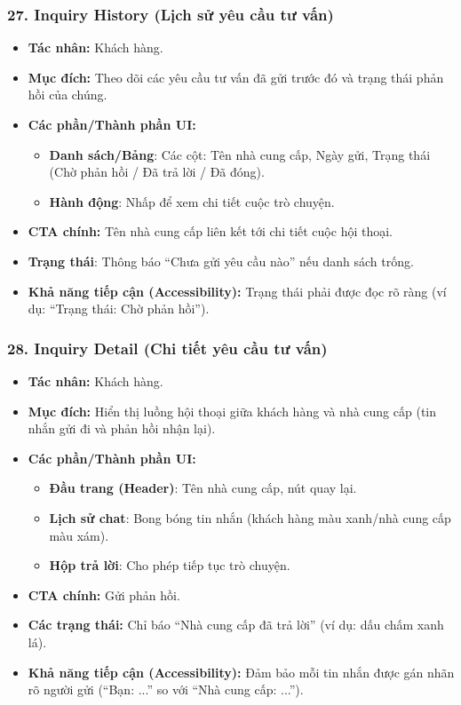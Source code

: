 \documentclass[11pt,a4paper]{article}
\begin{document}
\subsubsection{27. Inquiry History (Lịch sử yêu cầu tư vấn)}
\begin{itemize}
    \item \textbf{Tác nhân:} Khách hàng.
    \item \textbf{Mục đích:} Theo dõi các yêu cầu tư vấn đã gửi trước đó và trạng thái phản hồi của chúng.
    \item \textbf{Các phần/Thành phần UI:}
    \begin{itemize}
        \item \textbf{Danh sách/Bảng}: Các cột: Tên nhà cung cấp, Ngày gửi, Trạng thái (Chờ phản hồi / Đã trả lời / Đã đóng).
        \item \textbf{Hành động}: Nhấp để xem chi tiết cuộc trò chuyện.
    \end{itemize}
    \item \textbf{CTA chính:} Tên nhà cung cấp liên kết tới chi tiết cuộc hội thoại.
    \item \textbf{Trạng thái}: Thông báo ``Chưa gửi yêu cầu nào'' nếu danh sách trống.
    \item \textbf{Khả năng tiếp cận (Accessibility):} Trạng thái phải được đọc rõ ràng (ví dụ: ``Trạng thái: Chờ phản hồi'').
\end{itemize}

\subsubsection{28. Inquiry Detail (Chi tiết yêu cầu tư vấn)}
\begin{itemize}
    \item \textbf{Tác nhân:} Khách hàng.
    \item \textbf{Mục đích:} Hiển thị luồng hội thoại giữa khách hàng và nhà cung cấp (tin nhắn gửi đi và phản hồi nhận lại).
    \item \textbf{Các phần/Thành phần UI:}
    \begin{itemize}
        \item \textbf{Đầu trang (Header)}: Tên nhà cung cấp, nút quay lại.
        \item \textbf{Lịch sử chat}: Bong bóng tin nhắn (khách hàng màu xanh/nhà cung cấp màu xám).
        \item \textbf{Hộp trả lời}: Cho phép tiếp tục trò chuyện.
    \end{itemize}
    \item \textbf{CTA chính:} Gửi phản hồi.
    \item \textbf{Các trạng thái:} Chỉ báo ``Nhà cung cấp đã trả lời'' (ví dụ: dấu chấm xanh lá).
    \item \textbf{Khả năng tiếp cận (Accessibility):} Đảm bảo mỗi tin nhắn được gán nhãn rõ người gửi (``Bạn: ...'' so với ``Nhà cung cấp: ...'').
\end{itemize}
\end{document}
